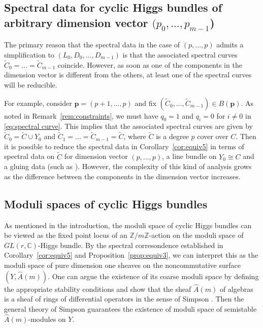 \documentclass[11pt]{amsart}
\theoremstyle{plain}
\theoremstyle{definition}
\theoremstyle{remark}
\def\C{\mathbb{C}}
\def\zm{\mathbb{Z}/m\mathbb{Z}}
\def\wAm{\widehat{A}(m)}
\def\tC{\widetilde{C}}
\begin{document}
\subsection{Spectral data for cyclic Higgs bundles of arbitrary dimension vector $(p_0,\dots,p_{m-1}$) }

The primary reason that the spectral data in the case of $(p,\dots, p)$ admits a simplification to $(L_0, D_0, \dots, D_{m-1})$ is that the associated spectral curves $\tC_0=\dots = \tC_{m-1}$ coincide. However, as soon as one of the components in the dimension vector is different from the others, at least one of the spectral curves will be reducible. 

For example, consider $\bm{p} = (p+1,\dots, p)$ and fix $(\tC_0,\dots, \tC_{m-1})\in B(\bm{p})$. As noted in Remark~\ref{rem:constraints}, we must have $q_0=1$ and $q_i=0$ for $i\neq 0$ in \ref{eq:spectral curve}. This implies that the associated spectral curves are given by $\tC_0 = \tC \cup Y_0$ and $\tC_1= \dots= \tC_{m-1}=\tC$, where $\tC$ is a degree $p$ cover over $C$. Then it is possible to reduce the spectral data in Corollary~\ref{cor:equiv5} in terms of spectral data on $\tC$ for dimension vector $(p,\dots, p)$, a line bundle on $Y_0\cong C$ and a gluing data (such as \cite[Corollary 5.10]{peónnieto2015cameraldatasup1phiggsbundles}). However, the complexity of this kind of analysis grows as the difference between the components in the dimension vector increases. 

\subsection{Moduli spaces of cyclic Higgs bundles}
As mentioned in the introduction, the moduli space of cyclic Higgs bundles can be viewed as the fixed point locus of an $\zm$-action on the moduli space of $GL(r,\C)$-Higgs bundle. By the spectral corresondence established in Corollary~\ref{cor:equiv5} and Proposition~\ref{prop:equiv3}, we can interpret this as the moduli space of pure dimension one sheaves on the noncommutative surface $(Y,\wAm)$. One can argue the existence of its coarse moduli space by defining the appropriate stability conditions and show that the sheaf $\wAm$ of algebras is a sheaf of rings of differential operators in the sense of Simpson \cite{Simpson94moduli1}. Then the general theory of Simpson guarantees the existence of moduli space of semistable $\wAm$-modules on $Y$. 
\end{document}
